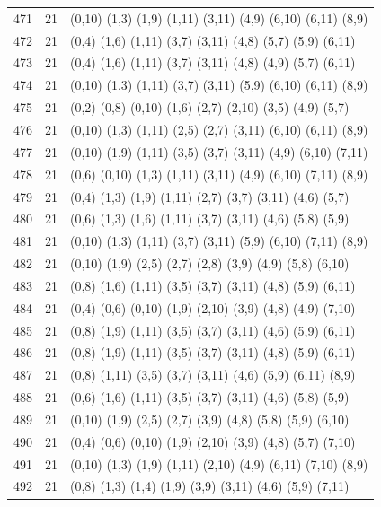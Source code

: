 \begin{appendix}
{\begin{longtable}{lll}
471& 21 & (0,10)  (1,3)  (1,9)  (1,11)  (3,11)  (4,9)   (6,10)  (6,11)  (8,9)\\
472& 21 & (0,4)   (1,6)  (1,11) (3,7)   (3,11)  (4,8)   (5,7)   (5,9)   (6,11)\\
473& 21 & (0,4)   (1,6)  (1,11) (3,7)   (3,11)  (4,8)   (4,9)   (5,7)   (6,11)\\
474& 21 & (0,10)  (1,3)  (1,11) (3,7)   (3,11)  (5,9)   (6,10)  (6,11)  (8,9)\\
475& 21 & (0,2)   (0,8)  (0,10) (1,6)   (2,7)   (2,10)  (3,5)   (4,9)   (5,7)\\
476& 21 & (0,10)  (1,3)  (1,11) (2,5)   (2,7)   (3,11)  (6,10)  (6,11)  (8,9)\\
477& 21 & (0,10)  (1,9)  (1,11) (3,5)   (3,7)   (3,11)  (4,9)   (6,10)  (7,11)\\
478& 21 & (0,6)   (0,10) (1,3)  (1,11)  (3,11)  (4,9)   (6,10)  (7,11)  (8,9)\\
479& 21 & (0,4)   (1,3)  (1,9)  (1,11)  (2,7)   (3,7)   (3,11)  (4,6)   (5,7)\\
480& 21 & (0,6)   (1,3)  (1,6)  (1,11)  (3,7)   (3,11)  (4,6)   (5,8)   (5,9)\\
481& 21 & (0,10)  (1,3)  (1,11) (3,7)   (3,11)  (5,9)   (6,10)  (7,11)  (8,9)\\
482& 21 & (0,10)  (1,9)  (2,5)  (2,7)   (2,8)   (3,9)   (4,9)   (5,8)   (6,10)\\
483& 21 & (0,8)   (1,6)  (1,11) (3,5)   (3,7)   (3,11)  (4,8)   (5,9)   (6,11)\\
484& 21 & (0,4)   (0,6)  (0,10) (1,9)   (2,10)  (3,9)   (4,8)   (4,9)   (7,10)\\
485& 21 & (0,8)   (1,9)  (1,11) (3,5)   (3,7)   (3,11)  (4,6)   (5,9)   (6,11)\\
486& 21 & (0,8)   (1,9)  (1,11) (3,5)   (3,7)   (3,11)  (4,8)   (5,9)   (6,11)\\
487& 21 & (0,8)   (1,11) (3,5)  (3,7)   (3,11)  (4,6)   (5,9)   (6,11)  (8,9)\\
488& 21 & (0,6)   (1,6)  (1,11) (3,5)   (3,7)   (3,11)  (4,6)   (5,8)   (5,9)\\
489& 21 & (0,10)  (1,9)  (2,5)  (2,7)   (3,9)   (4,8)   (5,8)   (5,9)   (6,10)\\
490& 21 & (0,4)   (0,6)  (0,10) (1,9)   (2,10)  (3,9)   (4,8)   (5,7)   (7,10)\\
491& 21 & (0,10)  (1,3)  (1,9)  (1,11)  (2,10)  (4,9)   (6,11)  (7,10)  (8,9)\\
492& 21 & (0,8)   (1,3)  (1,4)  (1,9)   (3,9)   (3,11)  (4,6)   (5,9)   (7,11)\\

\end{longtable}}
\end{appendix}

